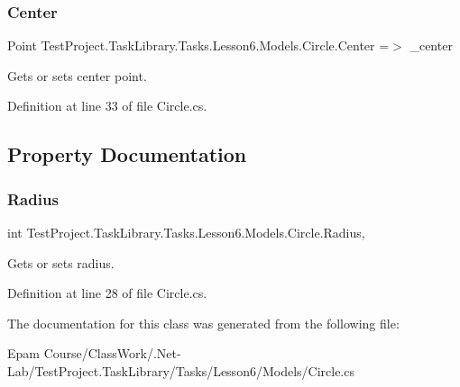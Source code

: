 \subsubsection{\texorpdfstring{Center}{Center}}
{\footnotesize\ttfamily Point Test\+Project.\+Task\+Library.\+Tasks.\+Lesson6.\+Models.\+Circle.\+Center =$>$ \+\_\+center}



Gets or sets center point. 



Definition at line 33 of file Circle.\+cs.



\subsection{Property Documentation}
\mbox{\label{class_test_project_1_1_task_library_1_1_tasks_1_1_lesson6_1_1_models_1_1_circle_aaa90ca9c05259731fb2c3684b9feb3bd}} 
\subsubsection{\texorpdfstring{Radius}{Radius}}
{\footnotesize\ttfamily int Test\+Project.\+Task\+Library.\+Tasks.\+Lesson6.\+Models.\+Circle.\+Radius\hspace{0.3cm}{\ttfamily [get]}, {\ttfamily [set]}}



Gets or sets radius. 



Definition at line 28 of file Circle.\+cs.



The documentation for this class was generated from the following file\+:\begin{DoxyCompactItemize}
\item 
Epam Course/\+Class\+Work/.\+Net-\/\+Lab/\+Test\+Project.\+Task\+Library/\+Tasks/\+Lesson6/\+Models/Circle.\+cs\end{DoxyCompactItemize}

